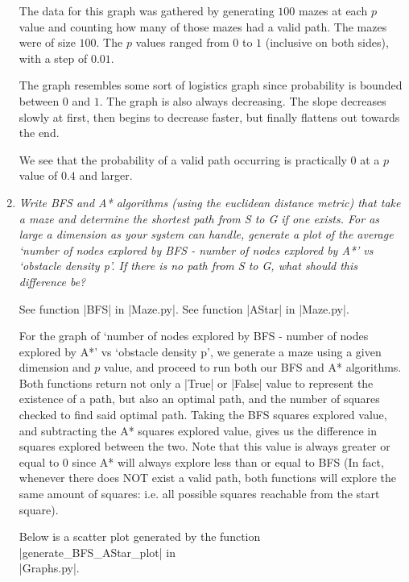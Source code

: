 \documentclass[12pt, twoside]{article}
\begin{document}
\begin{enumerate}
        The data for this graph was gathered by generating $100$ mazes at each $p$ value and counting how many of those mazes had a valid path. The mazes were of size $100$. The $p$ values ranged from $0$ to $1$ (inclusive on both sides), with a step of $0.01$. 

        The graph resembles some sort of logistics graph since probability is bounded between $0$ and $1$. The graph is also always decreasing. The slope decreases slowly at first, then begins to decrease faster, but finally flattens out towards the end. 
        
        We see that the probability of a valid path occurring is practically $0$ at a $p$ value of $0.4$ and larger.

        \vfill

    \item
        \textit{Write BFS and A* algorithms (using the euclidean distance metric) that take a maze and determine  the  shortest  path  from S to G if  one  exists.  For  as  large  a  dimension  as  your  system  can handle, generate a plot of the average ‘number of nodes explored by BFS - number of nodes explored by A*’ vs ‘obstacle density p’.  If there is no path from S to G, what should this difference be?}

        \vspace{4mm}
        See function \cverb|BFS| in \cverb|Maze.py|. See function \cverb|AStar| in \cverb|Maze.py|.

        \vspace{4mm}
        For the graph of `number of nodes explored by BFS - number of nodes explored by A*' vs `obstacle density p', we generate a maze using a given dimension and $p$ value, and proceed to run both our BFS and A* algorithms. Both functions return not only a \cverb|True| or \cverb|False| value to represent the existence of a path, but also an optimal path, and the number of squares checked to find said optimal path. Taking the BFS squares explored value, and subtracting the A* squares explored value, gives us the difference in squares explored between the two. Note that this value is always greater or equal to 0 since A* will always explore less than or equal to BFS (In fact, whenever there does NOT exist a valid path, both functions will explore the same amount of squares: i.e. all possible squares reachable from the start square).  

        Below is a scatter plot generated by the function \cverb|generate_BFS_AStar_plot| in \\ \cverb|Graphs.py|.


\end{enumerate}
\end{document}
